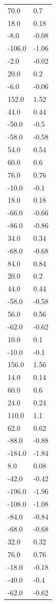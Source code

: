 \begin{longtable}{ll}
70.0 & 0.7 \\
18.0 & 0.18 \\
-8.0 & -0.08 \\
-106.0 & -1.06 \\
-2.0 & -0.02 \\
20.0 & 0.2 \\
-6.0 & -0.06 \\
152.0 & 1.52 \\
44.0 & 0.44 \\
-50.0 & -0.5 \\
-58.0 & -0.58 \\
54.0 & 0.54 \\
60.0 & 0.6 \\
76.0 & 0.76 \\
-10.0 & -0.1 \\
18.0 & 0.18 \\
-66.0 & -0.66 \\
-86.0 & -0.86 \\
34.0 & 0.34 \\
-68.0 & -0.68 \\
84.0 & 0.84 \\
20.0 & 0.2 \\
44.0 & 0.44 \\
-58.0 & -0.58 \\
56.0 & 0.56 \\
-62.0 & -0.62 \\
10.0 & 0.1 \\
-10.0 & -0.1 \\
156.0 & 1.56 \\
14.0 & 0.14 \\
60.0 & 0.6 \\
24.0 & 0.24 \\
110.0 & 1.1 \\
62.0 & 0.62 \\
-88.0 & -0.88 \\
-184.0 & -1.84 \\
8.0 & 0.08 \\
-42.0 & -0.42 \\
-196.0 & -1.96 \\
-108.0 & -1.08 \\
-84.0 & -0.84 \\
-68.0 & -0.68 \\
32.0 & 0.32 \\
76.0 & 0.76 \\
-18.0 & -0.18 \\
-40.0 & -0.4 \\
-62.0 & -0.62 \\

\end{longtable}
